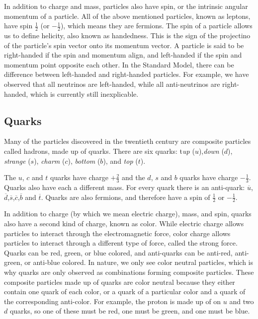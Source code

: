 In addition to charge and mass, particles also have spin, or the intrinsic angular momentum of a particle. All of the above mentioned particles, known as leptons, have spin $\frac{1}{2}$ (or $-\frac{1}{2}$), which means they are fermions. The spin of a particle allows us to define helicity, also known as handedness. This is the sign of the projectino of the particle's spin vector onto its momentum vector. A particle is said to be right-handed if the spin and momentum align, and left-handed if the spin and momentum point opposite each other. In the Standard Model, there can be difference between left-handed and right-handed particles. For example, we have observed that all neutrinos are left-handed, while all anti-neutrinos are right-handed, which is currently still inexplicable.

\subsection{Quarks}
Many of the particles discovered in the twentieth century are composite particles called hadrons, made up of quarks. There are six quarks: t\textit{up} ($u$),\textit{down} ($d$), \textit{strange} ($s$), \textit{charm} ($c$), \textit{bottom} ($b$), and \textit{top} ($t$).

The $u$, $c$ and $t$ quarks have charge $+\frac{2}{3}$ and the $d$, $s$ and $b$ quarks have charge $-\frac{1}{3}$. Quarks also have each a different mass. For every quark there is an anti-quark: $\overline{u}$,$\overline{d}$,$\overline{s}$,$\overline{c}$,$\overline{b}$ and $\overline{t}$. Quarks are also fermions, and therefore have a spin of $\frac{1}{2}$ or $-\frac{1}{2}$.

In addition to charge (by which we mean electric charge), mass, and spin, quarks also have a second kind of charge, known as color. While electric charge allows particles to interact through the electromagnetic force, color charge allows particles to interact through a different type of force, called the strong force. Quarks can be red, green, or blue colored, and anti-quarks can be anti-red, anti-green, or anti-blue colored. In nature, we only see color neutral particles, which is why quarks are only observed as combinations forming composite particles. These composite particles made up of quarks are color neutral because they either contain one quark of each color, or a quark of a particular color and a quark of the corresponding anti-color. For example, the proton is made up of on $u$ and two $d$ quarks, so one of these must be red, one must be green, and one must be blue.

